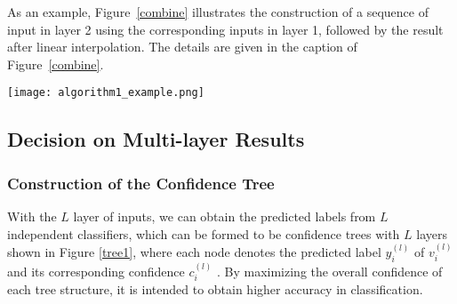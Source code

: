 \documentclass[letterpaper, 10 pt, conference]{ieeeconf}  %
\begin{document}
As an example, Figure~\ref{combine} illustrates the construction of a sequence of input in layer 2 using the corresponding inputs in layer 1, followed by the result after linear interpolation.  The details are given in the caption of Figure~\ref{combine}.




\begin{figure*}[tpb]
\centering
{}
\caption{Multi-layer of the GVG graph $G^{(l)}=\{V^{(l)},E^{(l)}\},l=1,2,3$ on Fr79. The red nodes correspond to the end-nodes, which will be eliminated in the next layer, and the black nodes will be preserved. The edges reveals the connection between these nodes.}
\label{gvg}
\end{figure*}





\begin{figure*}[tpb]
\centering
\texttt{[image: algorithm1\_example.png]}
\caption{An example of constructing $r_i^{(2)}$ and $\hat{r}_i^{(2)}$ where the axes are in meters. The left four figures illustrate $r_i^{(l)}$ and all of the $r_j^{(l)}$ carried by $v_j^{(l)}\in N(v_i^{(l)})$, where the black asterisk node denotes the position of $v_i^{(l)}$, the red asterisk nodes denote the position of $v_j^{(l)}$ and the blue nodes denote the range data collected from the real environment. Then the middle figure shows the constructed $r_i^{(2)}$ using ray casting. The interpolated sequence is given on the right, where the magenta points correspond to the interpolated ones. In this example, we have $q_i^{(2)} = 332/360 = 0.9222$.}
\label{combine}
\end{figure*}


\subsection{Decision on Multi-layer Results}

\subsubsection{Construction of the Confidence Tree}

With the $L$ layer of inputs, we can obtain the predicted labels from $L$ independent classifiers, which can be formed to be confidence trees with $L$ layers shown in Figure \ref{tree1}, where each node denotes the predicted label $\hat{y}_i^{(l)}$ of $v_i^{(l)}$  and its corresponding confidence $c_i^{(l)}$ . By maximizing the overall confidence of each tree structure, it is intended to obtain higher accuracy in classification.
\end{document}
